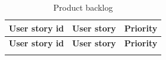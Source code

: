 \begin{longtable}{|l|p{10cm}|l|}
      \caption{Product backlog}                                                                                                \\
      \hline
      \rowcolor{blue!20} \textbf{User story id} & \textbf{User story}                                      & \textbf{Priority} \\
      \hline
      \endfirsthead

      \hline
      \rowcolor{blue!20} \textbf{User story id} & \textbf{User story}                                      & \textbf{Priority} \\
      \hline
      \endhead

      \hline
      \endfoot

      \hline
      \endlastfoot


\end{longtable}
